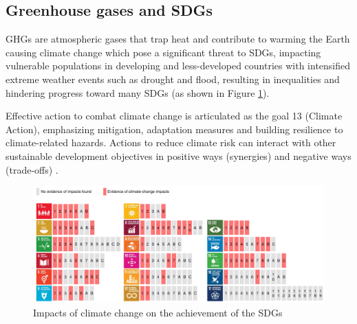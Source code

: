 \subsection{Greenhouse gases and SDGs}
GHGs are atmospheric gases that trap heat and contribute to warming the Earth causing climate change which pose a significant threat to SDGs, impacting vulnerable populations in developing and less-developed countries with intensified extreme weather events such as drought and flood, resulting in inequalities and hindering progress toward many SDGs (as shown in Figure \ref{fig:chap2_fig5}). \par
Effective action to combat climate change is articulated as the goal 13 (Climate Action), emphasizing mitigation, adaptation measures and building resilience to climate-related hazards. Actions to reduce climate risk can interact with other sustainable development objectives in positive ways (synergies) and negative ways (trade-offs) \citep{lee2023climate}. \par
\begin{figure}[tbh!]
    \centering
    \includegraphics[width=\textwidth]{figs/chap2/impact_cc_to_sdgs.png}
    \caption{Impacts of climate change on the achievement of the SDGs \citep{fuso2019connecting}}
    \label{fig:chap2_fig5}
\end{figure}
